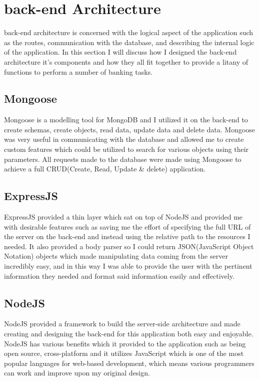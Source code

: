 \section{back-end Architecture}
back-end architecture is concerned with the logical aspect of the application such as the routes, communication with the database, and describing the internal logic of the application.  In this section I will discuss how I designed the back-end architecture it's components and how they all fit together to provide a litany of functions to perform a number of banking tasks.
\subsection{Mongoose}
Mongoose is a modelling tool for MongoDB and I utilized it on the back-end to create schemas, create objects, read data, update data and delete data. Mongoose was very useful in communicating with the database and allowed me to create custom features which could be utilized to search for various objects using their parameters.  All requests made to the database were made using Mongoose to achieve a full CRUD(Create, Read, Update \& delete) application.
\subsection{ExpressJS}
ExpressJS provided a thin layer which sat on top of NodeJS and provided me with desirable features such as saving me the effort of specifying the full URL of the server on the back-end and instead using the relative path to the resources I needed.  It also provided a body parser so I could return JSON(JavaScript Object Notation) objects which made manipulating data coming from the server incredibly easy, and in this way I was able to provide the user with the pertinent information they needed and format said information easily and effectively.
\subsection{NodeJS}
NodeJS provided a framework to build the server-side architecture and made creating and designing the back-end for this application both easy and enjoyable.  NodeJS has various benefits which it provided to the application such as being open source, cross-platform and it utilizes JavaScript which is one of the most popular languages for web-based development, which means various programmers can work and improve upon my original design.
